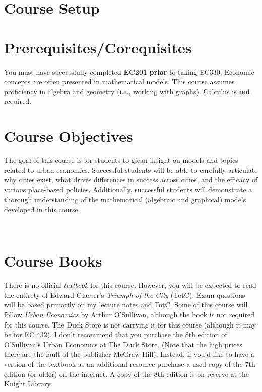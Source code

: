 \documentclass[11pt]{article}
\begin{document}
\section*{Course Setup}
		
		

	
	
	\section*{Prerequisites/Corequisites}
	You must have successfully completed \textbf{EC201} \textbf{prior} to taking EC330. Economic concepts are often presented in mathematical models. This course assumes proficiency in algebra and geometry (i.e., working with graphs). Calculus is \textbf{not} required.
	
	
	
	
	\section*{Course Objectives}
	
	The goal of this course is for students to glean insight on models and topics related to urban economics. Successful students will be able to carefully articulate why cities exist, what drives differences in success across cities, and the efficacy of various place-based policies. Additionally, successful students will demonstrate a thorough understanding of the mathematical (algebraic and graphical) models developed in this course.
	
	\
	\section*{Course Books}
	
	
	\noindent There is no official \textit{textbook} for this course. However, you will be expected to read the entirety of Edward Glaeser’s \textit{Triumph of the City} (TotC). Exam questions will be based primarily on my lecture notes and TotC. Some of this course will follow \textit{Urban Economics} by Arthur O'Sullivan, although the book is not required for this course. The Duck Store is not carrying it for this course (although it may be for EC 432). I don’t recommend that you purchase the 8th edition of O’Sullivan’s Urban Economics at The Duck Store. (Note that the high prices there are the fault of the publisher McGraw Hill). Instead, if you’d like to have a version of the textbook as an additional resource purchase a used copy of the 7th edition (or older) on the internet. A copy of the 8th edition is on reserve at the Knight Library.\\
	
\end{document}
